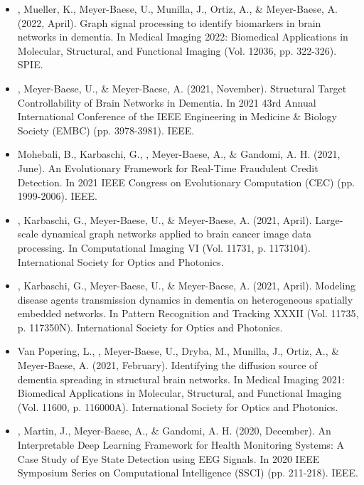 \documentclass[]{template}
\begin{document}
\sectionsep 
{}
\sectionsep
\begin{itemize}

\item {}, Mueller, K., Meyer-Baese, U., Munilla, J., Ortiz, A., \& Meyer-Baese, A. (2022, April). Graph signal processing to identify biomarkers in brain networks in dementia. In Medical Imaging 2022: Biomedical Applications in Molecular, Structural, and Functional Imaging (Vol. 12036, pp. 322-326). SPIE.

\item {}, Meyer-Baese, U., \& Meyer-Baese, A. (2021, November). Structural Target Controllability of Brain Networks in Dementia. In 2021 43rd Annual International Conference of the IEEE Engineering in Medicine \& Biology Society (EMBC) (pp. 3978-3981). IEEE.

\item Mohebali, B., Karbaschi, G., , Meyer-Baese, A., \& Gandomi, A. H. (2021, June). An Evolutionary Framework for Real-Time Fraudulent Credit Detection. In 2021 IEEE Congress on Evolutionary Computation (CEC) (pp. 1999-2006). IEEE.

\item {}, Karbaschi, G., Meyer-Baese, U., \& Meyer-Baese, A. (2021, April). Large-scale dynamical graph networks applied to brain cancer image data processing. In Computational Imaging VI (Vol. 11731, p. 1173104). International Society for Optics and Photonics.

\item {}, Karbaschi, G., Meyer-Baese, U., \& Meyer-Baese, A. (2021, April). Modeling disease agents transmission dynamics in dementia on heterogeneous spatially embedded networks. In Pattern Recognition and Tracking XXXII (Vol. 11735, p. 117350N). International Society for Optics and Photonics.


\item Van Popering, L., , Meyer-Baese, U., Dryba, M., Munilla, J., Ortiz, A., \& Meyer-Baese, A. (2021, February). Identifying the diffusion source of dementia spreading in structural brain networks. In Medical Imaging 2021: Biomedical Applications in Molecular, Structural, and Functional Imaging (Vol. 11600, p. 116000A). International Society for Optics and Photonics.

\item {}, Martin, J., Meyer-Baese, A., \& Gandomi, A. H. (2020, December). An Interpretable Deep Learning Framework for Health Monitoring Systems: A Case Study of Eye State Detection using EEG Signals. In 2020 IEEE Symposium Series on Computational Intelligence (SSCI) (pp. 211-218). IEEE.


\end{itemize}
\end{document}
